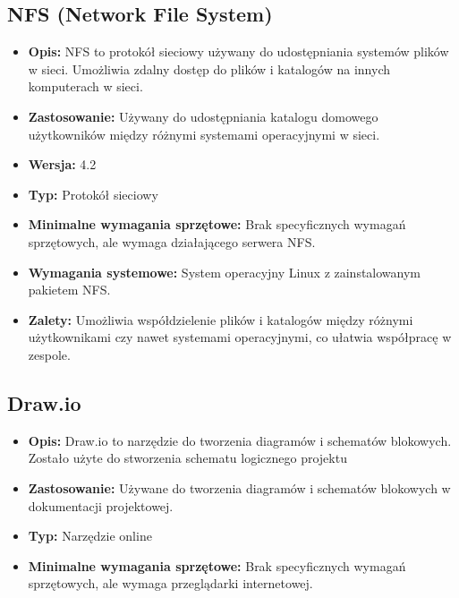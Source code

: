 \subsection{NFS (Network File System)}
\begin{itemize}
    \item \textbf{Opis:} NFS to protokół sieciowy używany do udostępniania systemów plików w sieci. Umożliwia zdalny dostęp do plików i katalogów na innych komputerach w sieci.
    \item \textbf{Zastosowanie:} Używany do udostępniania katalogu domowego użytkowników między różnymi systemami operacyjnymi w sieci.
    \item \textbf{Wersja:} 4.2
    \item \textbf{Typ:} Protokół sieciowy
    \item \textbf{Minimalne wymagania sprzętowe:} Brak specyficznych wymagań sprzętowych, ale wymaga działającego serwera NFS.
    \item \textbf{Wymagania systemowe:} System operacyjny Linux z zainstalowanym pakietem NFS.
    \item \textbf{Zalety:} Umożliwia współdzielenie plików i katalogów między różnymi użytkownikami czy nawet systemami operacyjnymi, co ułatwia współpracę w zespole.
\end{itemize}

\subsection{Draw.io}

\begin{itemize}
    \item \textbf{Opis:} Draw.io\cite{drawio} to narzędzie do tworzenia diagramów i schematów blokowych. Zostało użyte do stworzenia schematu logicznego projektu 
    \item \textbf{Zastosowanie:} Używane do tworzenia diagramów i schematów blokowych w dokumentacji projektowej.
    \item \textbf{Typ:} Narzędzie online
    \item \textbf{Minimalne wymagania sprzętowe:} Brak specyficznych wymagań sprzętowych, ale wymaga przeglądarki internetowej.
\end{itemize}